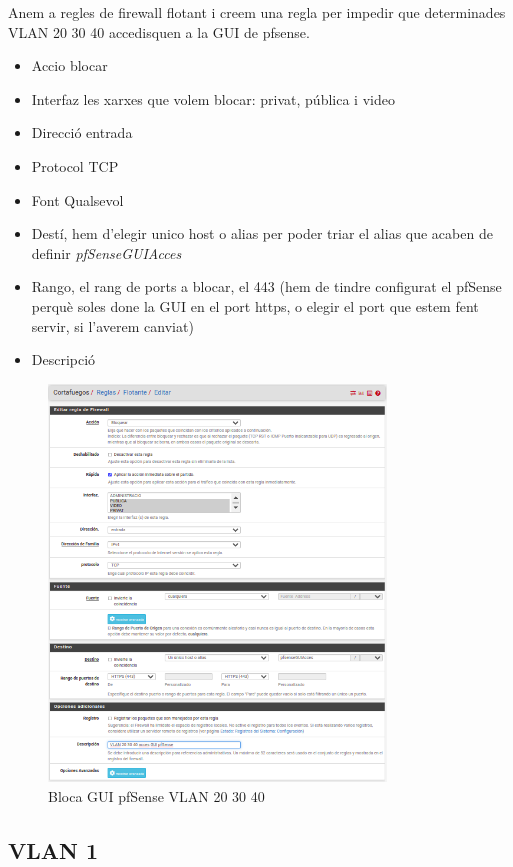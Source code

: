 \documentclass[
  10pt,
]{krantz}
\providecommand{\tightlist}{%
  \setlength{\itemsep}{0pt}\setlength{\parskip}{0pt}}
\begin{document}
Anem a regles de firewall flotant i creem una regla per impedir que determinades VLAN 20 30 40 accedisquen a la GUI de pfsense.

\begin{itemize}
\tightlist
\item
  Accio blocar
\item
  Interfaz les xarxes que volem blocar: privat, pública i video
\item
  Direcció entrada
\item
  Protocol TCP
\item
  Font Qualsevol
\item
  Destí, hem d'elegir unico host o alias per poder triar el alias que acaben de definir \emph{pfSenseGUIAcces}
\item
  Rango, el rang de ports a blocar, el 443 (hem de tindre configurat el pfSense perquè soles done la GUI en el port https, o elegir el port que estem fent servir, si l'averem canviat)
\item
  Descripció
\end{itemize}

\begin{figure}
\centering
\includegraphics[width=0.8\textwidth,height=\textheight]{imatges/proxmox/Bloca_pfSense_GUI_VLAN203040.png}
\caption{Bloca GUI pfSense VLAN 20 30 40}
\end{figure}

\hypertarget{vlan-1}{%
\subsection{VLAN 1}\label{vlan-1}}
\end{document}
